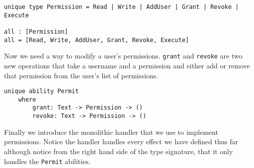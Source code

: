 \documentclass[logo,bsc,singlespacing,parskip]{infthesis}
\begin{document}
\begin{lstlisting}[language=unison]
unique type Permission = Read | Write | AddUser | Grant | Revoke | Execute

all : [Permission]
all = [Read, Write, AddUser, Grant, Revoke, Execute]
\end{lstlisting}

Now we need a way to modify a user's permissions. \texttt{grant} and \texttt{revoke} are two new operations that take a username and a permission and either add or remove that permission from the user's list of permissions.

\begin{lstlisting}[language=unison]
unique ability Permit 
    where 
        grant: Text -> Permission -> ()
        revoke: Text -> Permission -> ()
\end{lstlisting}

Finally we introduce the monolithic handler that we use to implement permissions. Notice the handler handles every effect we have defined thus far although notice from the right hand side of the type signature, that it only handles the \texttt{Permit} abilities.
\end{document}
